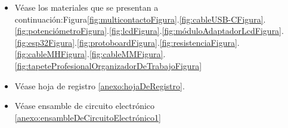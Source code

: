 \begin{itemize}
        \item Véase los materiales que se presentan a continuación:Figura\ref{fig:multicontactoFigura}.\ref{fig:cableUSB-CFigura}.\ref{fig:potenciómetroFigura}.\ref{fig:lcdFigura}.\ref{fig:móduloAdaptadorLcdFigura}.\ref{fig:esp32Figura}.\ref{fig:protoboardFigura}.\ref{fig:resistenciaFigura}.\ref{fig:cableMHFigura}.\ref{fig:cableMMFigura}.\ref{fig:tapeteProfesionalOrganizadorDeTrabajoFigura}
        \item Véase hoja de registro \ref{anexo:hojaDeRegistro}.
        \item Véase ensamble de circuito electrónico \ref{anexo:ensambleDeCircuitoElectrónico1}
    \end{itemize}
